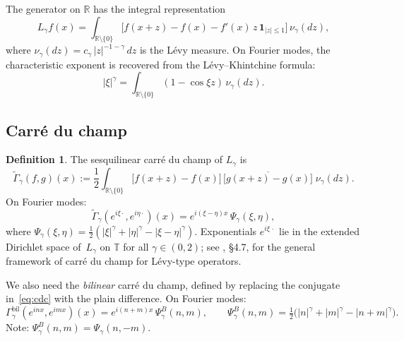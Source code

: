 \documentclass[11pt,a4paper]{article}
\theoremstyle{plain}
\theoremstyle{definition}
\newtheorem{definition}[theorem]{Definition}
\theoremstyle{remark}
\newcommand{\R}{\mathbb{R}}
\newcommand{\T}{\mathbb{T}}
\begin{document}
The generator on $\R$ has the integral representation
\begin{equation}\label{eq:generator}
  L_\gamma f(x)
  = \int_{\R \setminus \{0\}}
  \bigl[f(x+z) - f(x) - f'(x)\,z\,\mathbf{1}_{|z| \leq 1}\bigr]
  \,\nu_\gamma(dz),
\end{equation}
where $\nu_\gamma(dz) = c_\gamma\,|z|^{-1-\gamma}\,dz$ is the
L\'evy measure.
On Fourier modes, the characteristic exponent is recovered from
the L\'evy--Khintchine formula:
\begin{equation}\label{eq:LK}
  |\xi|^\gamma
  = \int_{\R \setminus \{0\}}
  (1 - \cos \xi z)\,\nu_\gamma(dz).
\end{equation}


\subsection{Carr\'e du champ}

\begin{definition}\label{def:cdc}
The sesquilinear carr\'e du champ of $L_\gamma$ is
\begin{equation}\label{eq:cdc}
  \widetilde{\Gamma}_\gamma(f,g)(x)
  := \frac{1}{2} \int_{\R \setminus \{0\}}
  \bigl[f(x+z) - f(x)\bigr]\,
  \overline{\bigl[g(x+z) - g(x)\bigr]}\;
  \nu_\gamma(dz).
\end{equation}
On Fourier modes:
\begin{equation}\label{eq:psi-kernel}
  \widetilde{\Gamma}_\gamma(e^{i\xi\cdot}, e^{i\eta\cdot})(x)
  = e^{i(\xi-\eta)x}\,\Psi_\gamma(\xi,\eta),
\end{equation}
where $\Psi_\gamma(\xi,\eta)
= \tfrac{1}{2}(|\xi|^\gamma + |\eta|^\gamma - |\xi-\eta|^\gamma)$.
Exponentials $e^{i\xi\,\cdot}$ lie in the extended Dirichlet space
of~$L_\gamma$ on $\T$ for all $\gamma \in (0,2)$; see
\cite{BoettcherSchillingWang2013}, \S4.7, for the general framework
of carr\'e du champ for L\'evy-type operators.
\end{definition}

We also need the \emph{bilinear} carr\'e du champ, defined by replacing
the conjugate in~\eqref{eq:cdc} with the plain difference. On Fourier modes:
\begin{equation}\label{eq:psi-bilinear}
  \Gamma_\gamma^{\mathrm{bil}}(e^{inx}, e^{imx})(x)
  = e^{i(n+m)x}\,\Psi_\gamma^B(n,m),
  \qquad
  \Psi_\gamma^B(n,m) = \tfrac{1}{2}\bigl(|n|^\gamma + |m|^\gamma
  - |n+m|^\gamma\bigr).
\end{equation}
Note: $\Psi_\gamma^B(n,m) = \Psi_\gamma(n,-m)$.
\end{document}
